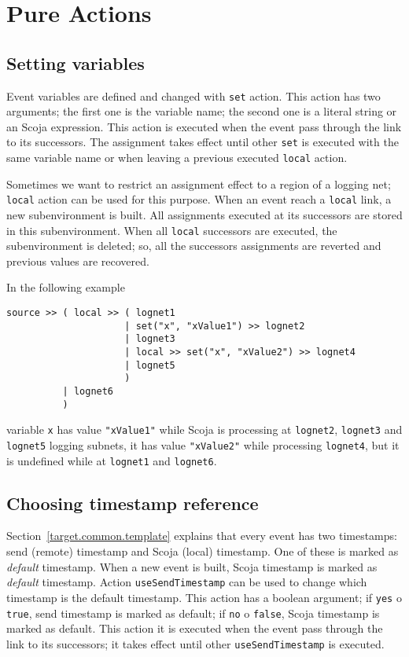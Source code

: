 
\section{Pure Actions}

\subsection{Setting variables}
Event variables are defined and changed with {\tt set} action.
This action has two arguments;
the first one is the variable name;
the second one is a literal string or an Scoja expression.
This action is executed when the event pass through the link to its
successors.
The assignment takes effect until other {\tt set} is executed with the
same variable name or when leaving a previous executed {\tt local}
action.

Sometimes we want to restrict an assignment effect to a region of
a logging net; {\tt local} action can be used for this purpose.
When an event reach a {\tt local} link, a new subenvironment is built.
All assignments executed at its successors are stored in this
subenvironment.
When all {\tt local} successors are executed, the subenvironment is
deleted; so, all the successors assignments are reverted and previous
values are recovered.

In the following example
\begin{verbatim}
source >> ( local >> ( lognet1
                     | set("x", "xValue1") >> lognet2
                     | lognet3
                     | local >> set("x", "xValue2") >> lognet4
                     | lognet5
                     )
          | lognet6
          )
\end{verbatim}
variable {\tt x} has value {\tt "xValue1"} while Scoja is processing at
{\tt lognet2}, {\tt lognet3} and {\tt lognet5} logging subnets,
it has value {\tt "xValue2"} while processing {\tt lognet4},
but it is undefined while at {\tt lognet1} and {\tt lognet6}.

\subsection{Choosing timestamp reference}
Section~\ref{target.common.template} explains that every event has two
timestamps: send (remote) timestamp and Scoja (local) timestamp.
One of these is marked as \emph{default} timestamp.
When a new event is built, Scoja timestamp is marked as \emph{default}
timestamp.
Action {\tt useSendTimestamp} can be used to change which timestamp is
the default timestamp.
This action has a boolean argument;
if {\tt yes} o {\tt true}, send timestamp is marked as default;
if {\tt no} o {\tt false}, Scoja timestamp is marked as default.
This action it is executed when the event pass through the link to its
successors; it takes effect until other {\tt useSendTimestamp} is
executed.

